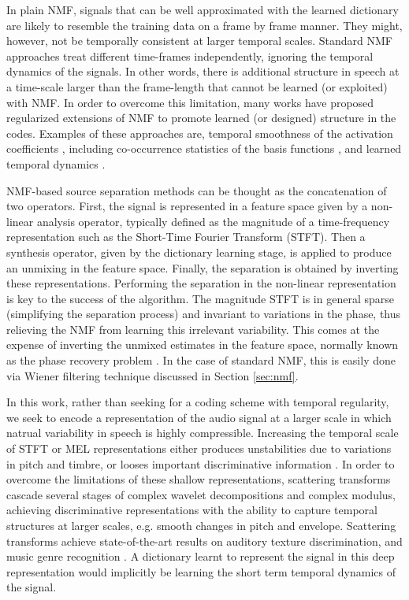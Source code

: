 In plain NMF, signals that can be well approximated with the learned dictionary are
likely to resemble the training data on a frame by frame manner. They might, however, 
not be temporally consistent at larger temporal scales.
 Standard NMF approaches treat different time-frames independently, ignoring the 
temporal dynamics of the signals. In other words, there is additional structure in speech at a time-scale larger than
the frame-length that cannot be learned (or exploited) with NMF. In order to overcome this limitation,  
many works have proposed regularized extensions of NMF to promote learned (or designed) structure in the codes. Examples of these approaches are, temporal smoothness of the activation coefficients \cite{fevotte2011majorization}, including  co-occurrence statistics of the basis functions \cite{WilsonRSD08}, and learned temporal dynamics \cite{MysoreS11,HanMP12,icassp13a,mohammadiha2013nonnegative}.

NMF-based source separation methods can be thought as the concatenation of two operators.
First, the signal is represented in a feature space given by a non-linear analysis operator, 
typically defined as the magnitude of a time-frequency representation such
as the Short-Time Fourier Transform (STFT). 
Then a synthesis operator, given by the dictionary learning stage, is applied to produce an unmixing in the feature space.
Finally, the separation is obtained by inverting these representations. 
Performing the separation in the non-linear representation is key to the success of the algorithm. The magnitude STFT is in general sparse (simplifying the separation process) and invariant to variations in the phase, thus relieving the NMF from
learning this irrelevant variability. 
This comes at the expense of inverting the unmixed estimates in the feature space, normally known as the
phase recovery problem \cite{yonina}. In the case of standard NMF, this is easily done via Wiener filtering technique discussed in Section \ref{sec:nmf}.

In this work, rather than seeking for a coding scheme with temporal regularity, we seek to encode a representation of the audio signal at a larger scale in which natrual variability in speech is highly compressible. 
Increasing the temporal scale of STFT or MEL representations either produces unstabilities due to 
variations in pitch and timbre, or looses important discriminative information \cite{deepscatt}. 
In order to overcome the limitations of these shallow representations, 
scattering transforms \cite{pami, deepscatt} cascade several 
stages of complex wavelet decompositions and complex modulus, achieving 
discriminative representations with the ability to capture temporal structures at larger scales, 
e.g. smooth changes in pitch and envelope. 
Scattering transforms achieve state-of-the-art results on auditory texture discrimination, and music genre recognition \cite{deepscatt, phdjoan}.
A dictionary learnt to represent the signal in this deep representation would implicitly be learning the short term temporal dynamics of the signal.

